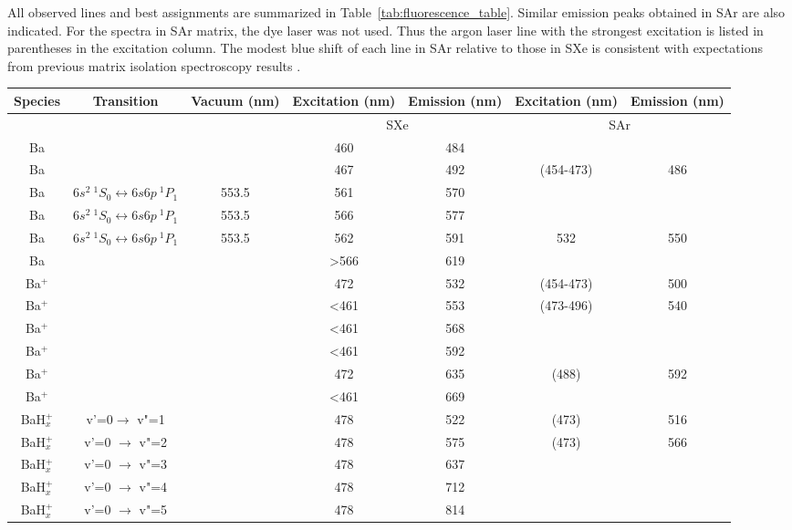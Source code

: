 \documentclass[aps,pra,reprint,superscriptaddress]{revtex4-1}
\begin{document}
All observed lines and best assignments are summarized in Table~\ref{tab:fluorescence_table}.
Similar emission peaks obtained in SAr are also indicated.
For the spectra in SAr matrix, the dye laser was not used.
Thus the argon laser line with the strongest excitation is listed in parentheses in the excitation column.
The modest blue shift of each line in SAr relative to those in SXe is consistent with expectations from previous matrix isolation spectroscopy results \cite{Crepin1999}.

\begin{table*}[t]
 \begin{ruledtabular}

	\caption{Summary of peak wavelengths of observed absorption and emission lines in SXe and SAr, species and transition assigned and vacuum wavelengths for comparison.  Excitation wavelengths in parentheses are the argon ion wavelengths that give maximum emission.}
	\label{tab:fluorescence_table}
	\begin{center}
	\begin{tabular}{c c c c c c c}
	Species & Transition & Vacuum (nm) & Excitation (nm) & Emission (nm) & Excitation (nm) & Emission (nm)\\
	\hline
	\multicolumn{3}{c}{} & \multicolumn{2}{c}{SXe} & \multicolumn{2}{c}{SAr}\\
	\hline
	Ba & & & 460 & 484 & &\\
	Ba & & & 467 & 492 & (454-473) & 486\\
	Ba & $6s^2 ~{^1}S_0\leftrightarrow 6s6p ~{^1}P_1$ & 553.5 & 561 & 570& & \\
	Ba & $6s^2 ~{^1}S_0\leftrightarrow 6s6p ~{^1}P_1$ & 553.5 & 566 & 577&  & \\
	Ba & $6s^2 ~{^1}S_0\leftrightarrow 6s6p ~{^1}P_1$ & 553.5 & 562 & 591 & 532 & 550\\
	Ba & & & \textgreater 566 & 619 & &\\
	Ba$^{+}$ & & & 472 & 532 & (454-473) & 500\\
	Ba$^{+}$ & & &  \textless 461 & 553 & (473-496) & 540\\
	Ba$^{+}$ & & &  \textless 461 & 568\\
	Ba$^{+}$ & & &  \textless 461 & 592\\
	Ba$^{+}$ & & & 472 & 635 & (488) & 592\\
	Ba$^{+}$ & & &  \textless 461 & 669\\
	BaH$_x^{+}$ & v'=0$ \rightarrow$ v"=1 & & 478 & 522 & (473) & 516\\
	BaH$_x^{+}$ & v'=0 $\rightarrow$ v"=2 & & 478 & 575 & (473) & 566\\
	BaH$_x^{+}$ & v'=0 $\rightarrow$ v"=3 & & 478 & 637\\
	BaH$_x^{+}$ & v'=0 $\rightarrow$ v"=4 & & 478 & 712\\
	BaH$_x^{+}$ & v'=0 $\rightarrow$ v"=5 & & 478 & 814\\
	\end{tabular}
	\end{center}

\end{ruledtabular}
\end{table*}
\end{document}
